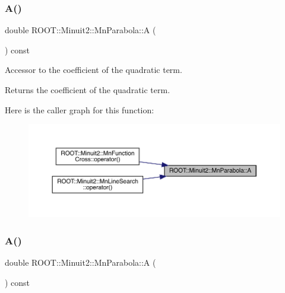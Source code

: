 \subsubsection{\texorpdfstring{A()}{A()}\hspace{0.1cm}{\footnotesize\ttfamily [1/2]}}
{\footnotesize\ttfamily double R\+O\+O\+T\+::\+Minuit2\+::\+Mn\+Parabola\+::A (\begin{DoxyParamCaption}{ }\end{DoxyParamCaption}) const\hspace{0.3cm}{\ttfamily [inline]}}

Accessor to the coefficient of the quadratic term.

\begin{DoxyReturn}{Returns}
the coefficient of the quadratic term. 
\end{DoxyReturn}
Here is the caller graph for this function\+:\nopagebreak
\begin{figure}[H]
\begin{center}
\leavevmode
\includegraphics[width=350pt]{db/d7d/classROOT_1_1Minuit2_1_1MnParabola_ae5ca4bea19ba4c0243ca70bb6e55e827_icgraph}
\end{center}
\end{figure}
\mbox{\label{classROOT_1_1Minuit2_1_1MnParabola_ae5ca4bea19ba4c0243ca70bb6e55e827}} 
\subsubsection{\texorpdfstring{A()}{A()}\hspace{0.1cm}{\footnotesize\ttfamily [2/2]}}
{\footnotesize\ttfamily double R\+O\+O\+T\+::\+Minuit2\+::\+Mn\+Parabola\+::A (\begin{DoxyParamCaption}{ }\end{DoxyParamCaption}) const\hspace{0.3cm}{\ttfamily [inline]}}

